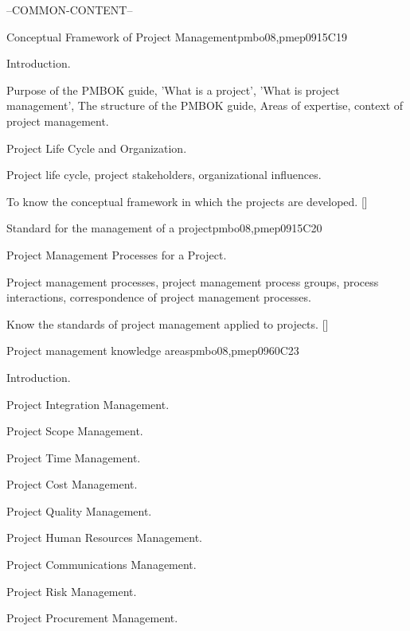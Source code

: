 \begin{syllabus}

--COMMON-CONTENT--

\begin{unit}{Conceptual Framework of Project Management}{}{pmbo08,pmep09}{15}{C19}
\begin{topics}
      \item Introduction.
      \item Purpose of the PMBOK guide, 'What is a project', 'What is project management', The structure of the PMBOK guide, Areas of expertise, context of project management.
      \item Project Life Cycle and Organization.
      \item Project life cycle, project stakeholders, organizational influences.
   \end{topics}

   \begin{learningoutcomes}
      \item To know the conceptual framework in which the projects are developed. [\Usage]
   \end{learningoutcomes}
\end{unit}

\begin{unit}{Standard for the management of a project}{}{pmbo08,pmep09}{15}{C20}
\begin{topics}
      \item Project Management Processes for a Project.
      \item Project management processes, project management process groups, process interactions, correspondence of project management processes.
   \end{topics}

   \begin{learningoutcomes}
      \item Know the standards of project management applied to projects. [\Usage]
   \end{learningoutcomes}
\end{unit}

\begin{unit}{Project management knowledge areas}{}{pmbo08,pmep09}{60}{C23}
\begin{topics}
      \item Introduction.
      \item Project Integration Management.
      \item Project Scope Management.
      \item Project Time Management.
      \item Project Cost Management.
      \item Project Quality Management.
      \item Project Human Resources Management.
      \item Project Communications Management.
      \item Project Risk Management.
      \item Project Procurement Management.
   \end{topics}


\end{unit}
\end{syllabus}
